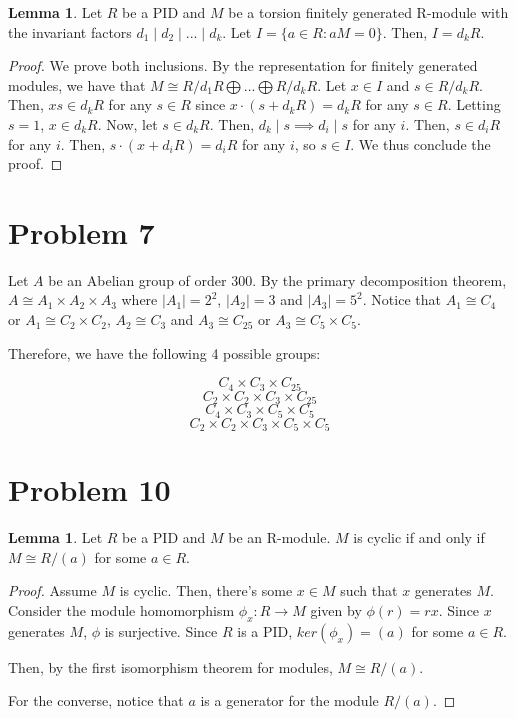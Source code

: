 \documentclass{article}
\theoremstyle{definition}
\newtheorem{lemma}[theorem]{Lemma}
\begin{document}
\begin{lemma}
    Let $R$ be a PID and $M$ be a torsion finitely generated R-module with the invariant factors $d_{1} \mid d_{2} \mid ... \mid d_{k}$. Let $I = \{a \in R: aM = 0\}$. Then, $I = d_{k}R$.
\end{lemma}
\begin{proof}
    We prove both inclusions. By the representation for finitely generated modules, we have that $M \cong R/d_{1}R \bigoplus ... \bigoplus R/d_{k}R$. Let $x \in I$ and $s \in R/d_{k}R$. Then, $xs \in d_{k}R$ for any $s \in R$ since $x \cdot (s + d_{k}R) = d_{k}R$ for any $s \in R$. Letting $s = 1$, $x \in d_{k}R$. Now, let $s \in d_{k}R$. Then, $d_{k} \mid s \implies d_{i} \mid s$ for any $i$. Then, $s \in d_{i}R$ for any $i$. Then, $s \cdot (x + d_{i}R) = d_{i}R$ for any $i$, so $s \in I$. We thus conclude the proof.
\end{proof}

\section{Problem 7}

Let $A$ be an Abelian group of order 300. By the primary decomposition theorem, $A \cong A_{1} \times A_{2} \times A_{3}$ where $\lvert A_{1} \rvert = 2^{2}$, $\lvert A_{2} \rvert = 3$ and $\lvert A_{3} \rvert = 5^{2}$. Notice that $A_{1} \cong C_{4}$ or $A_{1} \cong C_{2} \times C_{2}$, $A_{2} \cong C_{3}$ and $A_{3} \cong C_{25}$ or $A_{3} \cong C_{5} \times C_{5}$.

Therefore, we have the following 4 possible groups:

\[ C_{4} \times C_{3} \times C_{25}\]
\[ C_{2} \times C_{2} \times C_{3} \times C_{25}\]
\[ C_{4} \times C_{3} \times C_{5} \times C_{5}\]
\[ C_{2} \times C_{2} \times C_{3} \times C_{5} \times C_{5}\]


\section{Problem 10}

\begin{lemma}
    Let $R$ be a PID and $M$ be an R-module. $M$ is cyclic if and only if $M \cong R/(a)$ for some $a \in R$.
\end{lemma}
\begin{proof}
    Assume $M$ is cyclic. Then, there's some $x \in M$ such that $x$ generates $M$. Consider the module homomorphism $\phi_{x}: R \xrightarrow{} M$ given by $\phi(r) = rx$. Since $x$ generates $M$, $\phi$ is surjective. Since $R$ is a PID, $ker(\phi_{x}) = (a)$ for some $a \in R$.
    
    Then, by the first isomorphism theorem for modules, $M \cong R/(a)$. 

    For the converse, notice that $a$ is a generator for the module $R/(a)$.
\end{proof}
\end{document}

